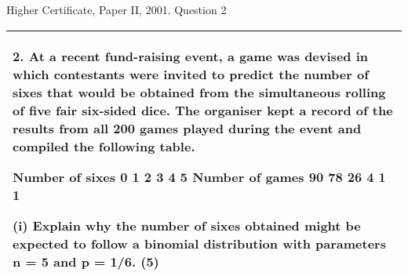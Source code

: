 \documentclass[a4paper,12pt]{article}
\begin{document}
Higher Certificate, Paper II, 2001. Question 2%
\begin{table}[ht!]
 
\centering
 
\begin{tabular}{|p{15cm}|}
 
\hline  

2. At a recent fund-raising event, a game was devised in which contestants were invited to predict the number of sixes that would be obtained from the simultaneous rolling of five fair six-sided dice.  The organiser kept a record of the results from all 200 games played during the event and compiled the following table. 
 
Number of sixes   0   1   2 3 4 5 Number of games 90 78 26 4 1 1 
 
(i) Explain why the number of sixes obtained might be expected to follow a binomial distribution with parameters n = 5 and p = 1/6. (5) 
 
\\ \hline
  
\end{tabular}

\end{table} 
\end{document}
